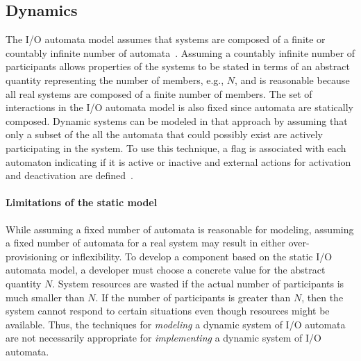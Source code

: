 

\subsection{Dynamics\label{dynamics}}

The I/O automata model assumes that systems are composed of a finite or countably infinite number of automata~\cite{lynch1996distributed}.
Assuming a countably infinite number of participants allows properties of the systems to be stated in terms of an abstract quantity representing the number of members, e.g., $N$, and is reasonable because all real systems are composed of a finite number of members.
The set of interactions in the I/O automata model is also fixed since automata are statically composed.
Dynamic systems can be modeled in that approach by assuming that only a subset of the all the automata that could possibly exist are actively participating in the system.
To use this technique, a flag is associated with each automaton indicating if it is active or inactive and external actions for activation and deactivation are defined~\cite{lynch1994atomic}.

\paragraph*{Limitations of the static model}
While assuming a fixed number of automata is reasonable for modeling, assuming a fixed number of automata for a real system may result in either over-provisioning or inflexibility.
To develop a component based on the static I/O automata model, a developer must choose a concrete value for the abstract quantity $N$.
System resources are wasted if the actual number of participants is much smaller than $N$.
If the number of participants is greater than $N$, then the system cannot respond to certain situations even though resources might be available.
Thus, the techniques for \emph{modeling} a dynamic system of I/O automata are not necessarily appropriate for \emph{implementing} a dynamic system of I/O automata.

